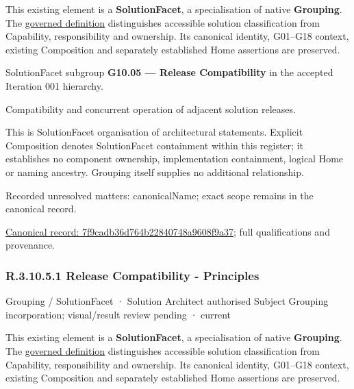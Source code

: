 This existing element is a \textbf{SolutionFacet}, a specialisation of native
\textbf{Grouping}. The \href{\detokenize{../../../../../../../governance/continuum-representation.md#solutionfacet-classification--1119-candidate}}{governed definition}
distinguishes accessible solution classification from Capability, responsibility
and ownership. Its canonical identity, G01–G18 context, existing Composition
and separately established Home assertions are preserved.



SolutionFacet subgroup \textbf{G10.05 — Release Compatibility} in the accepted Iteration 001 hierarchy.



Compatibility and concurrent operation of adjacent solution releases.



This is SolutionFacet organisation of architectural statements. Explicit Composition denotes SolutionFacet containment within this register; it establishes no component ownership, implementation containment, logical Home or naming ancestry. Grouping itself supplies no additional relationship.


{\small Recorded unresolved matters: canonicalName; exact scope remains in the canonical record.}\par
{\footnotesize \href{../../../../../../../continuum/grouping/7f9cadb36d764b22840748a9608f9a37.md}{Canonical record: 7f9cadb36d764b22840748a9608f9a37}; full qualifications and provenance.}\par
\subsubsection*{R.3.10.5.1 Release Compatibility - Principles}
\label{navigation:R.3.10.5.1}

\label{element:31812051912e4dd99b07125d86ca2c11}
{\small Grouping / SolutionFacet · Solution Architect authorised Subject Grouping incorporation; visual/result review pending · current}\par

This existing element is a \textbf{SolutionFacet}, a specialisation of native
\textbf{Grouping}. The \href{\detokenize{../../../../../../../governance/continuum-representation.md#solutionfacet-classification--1119-candidate}}{governed definition}
distinguishes accessible solution classification from Capability, responsibility
and ownership. Its canonical identity, G01–G18 context, existing Composition
and separately established Home assertions are preserved.



